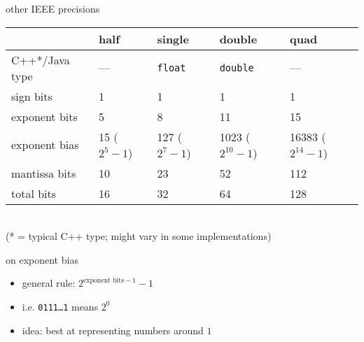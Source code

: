 \begin{frame}{other IEEE precisions}
\begin{tabular}{l|llll}
~ & half & single & double & quad \\ \hline
C++*/Java type& --- & \texttt{float} & \texttt{double} & ---\\
sign bits & 1 & 1 & 1 & 1\\
exponent bits & 5 & 8 & 11 & 15 \\
    exponent bias & 15 {\small ($2^5-1$)} & 127 {\small ($2^7-1$)} & 1023 {\small ($2^{10}-1$)} & 16383 {\small ($2^{14}-1$)}\\
mantissa bits & 10 & 23 & 52 & 112\\
total bits & 16 & 32 & 64 & 128\\
\end{tabular}\\
    {\scriptsize (* = typical C++ type; might vary in some implementations)}
\end{frame}


\begin{frame}{on exponent bias}
    \begin{itemize}
        \item general rule: $2^{\text{exponent bits} - 1} - 1$
        \item i.e. \texttt{0111\ldots1} means $2^0$
        \item idea: best at representing numbers around $1$
    \end{itemize}
\end{frame}
